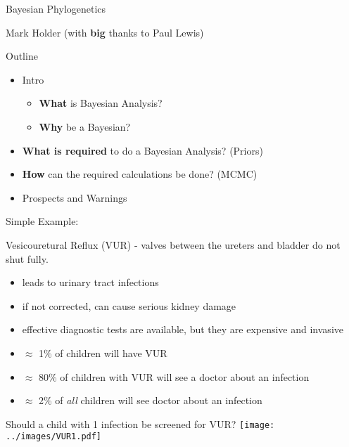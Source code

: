 \documentclass{seminar}
\begin{document}
\pagestyle{empty}
\begin{slide}
\begin{center}
\Huge Bayesian Phylogenetics \par\Large Mark Holder (with {\bf big} thanks to Paul Lewis)
\end{center}
\newslide
\centerslidesfalse
Outline
\begin{itemize}
	\item Intro 
		\begin{itemize}
			\item {\bf What} is Bayesian Analysis? 
			\item {\bf Why} be a Bayesian?
		\end{itemize}
	\item {\bf What is required} to do a Bayesian Analysis? (Priors)
	\item {\bf How} can the required calculations be done? (MCMC)
	\item Prospects and Warnings
\end{itemize}
\newslide
\large Simple Example:  

Vesicouretural Reflux (VUR) - valves between the ureters and bladder do not shut fully.
\begin{itemize}
	\item leads to urinary tract infections 
	\item if not corrected, can cause serious kidney damage
	\item effective diagnostic tests are available, but they are expensive and invasive
\end{itemize}
\newslide
\begin{itemize}
	\item $\approx$ 1\% of children will have VUR
	\item $\approx$ 80\% of children with VUR will see a doctor about an infection
	\item $\approx$ 2\% of {\em all} children will see doctor about an infection\\[30pt]
\end{itemize}
\Large Should a child with 1 infection be screened for VUR?\large
\newslide
\texttt{[image: ../images/VUR1.pdf]}
\newslide
{}
\newslide
{}
\newslide
{}
\newslide
{}
\newslide
{}


\end{slide}
\end{document}

